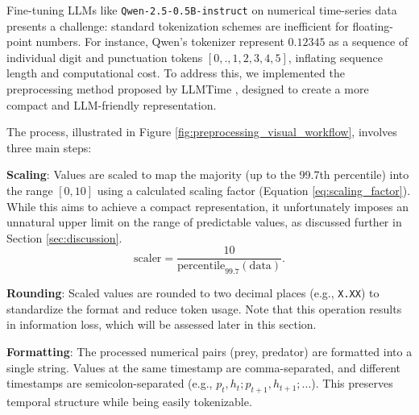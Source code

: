 \documentclass{article}
\begin{document}
Fine-tuning LLMs like \texttt{Qwen-2.5-0.5B-instruct} on numerical time-series data presents a challenge: standard tokenization schemes are inefficient for floating-point numbers. For instance, Qwen's tokenizer represent $0.12345$ as a sequence of individual digit and punctuation tokens $[0, ., 1, 2, 3, 4, 5]$, inflating sequence length and computational cost. To address this, we implemented the preprocessing method proposed by LLMTime \cite{gruver2024largelanguagemodelszeroshot}, designed to create a more compact and LLM-friendly representation.

The process, illustrated in Figure \ref{fig:preprocessing_visual_workflow}, involves three main steps:
\begin{zenumerate}
    \item \textbf{Scaling}: Values are scaled to map the majority (up to the 99.7th percentile) into the range $[0, 10]$ using a calculated scaling factor (Equation \ref{eq:scaling_factor}). While this aims to achieve a compact representation, it unfortunately imposes an unnatural upper limit on the range of predictable values, as discussed further in Section \ref{sec:discussion}.
    \begin{equation}
        \text{scaler} = \frac{10}{\text{percentile}_{99.7}(\text{data})}.
        \label{eq:scaling_factor}
    \end{equation}
    \item \textbf{Rounding}: Scaled values are rounded to two decimal places (e.g., \texttt{X.XX}) to standardize the format and reduce token usage. Note that this operation results in information loss, which will be assessed later in this section.
    \item \textbf{Formatting}: The processed numerical pairs (prey, predator) are formatted into a single string. Values at the same timestamp are comma-separated, and different timestamps are semicolon-separated (e.g., $p_t, h_t ; p_{t+1}, h_{t+1} ; ...$). This preserves temporal structure while being easily tokenizable.
\end{zenumerate}
\end{document}
